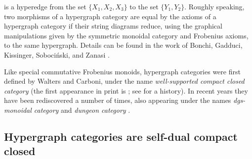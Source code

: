 is a hyperedge from the set $\{X_1,X_2,X_3\}$ to the set $\{Y_1,Y_2\}$. Roughly
speaking, two morphisms of a hypergraph category are equal by the axioms of a
hypergraph category if their string diagrams reduce, using the graphical
manipulations given by the symmetric monoidal category and Frobenius axioms, to
the same hypergraph. Details can be found in the work of Bonchi, Gadduci,
Kissinger, Soboci\'nski, and Zanasi \cite{BGKSZ}.

Like special commutative Frobenius monoids, hypergraph categories were first
defined by Walters and Carboni, under the name \emph{well-supported compact
closed category} (the first appearance in print is \cite{Car91}; see
\cite{RSW05} for a history).  In recent years they have been rediscovered a
number of times, also appearing under the names \emph{dgs-monoidal category}
\cite{GH98} and \emph{dungeon category} \cite{Mor14}. 




\subsection{Hypergraph categories are self-dual compact closed}
\label{ssec.compactclosed}

